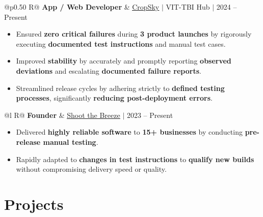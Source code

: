 \documentclass[a4paper,10pt]{article}
\newcommand{\ulink}[2]{\href{#1}{\uline{#2}}}
\newcommand{\subheading}[1]{{\color[HTML]{0A0A0A}\fontsize{12}{14}\selectfont\bfseries #1}}
\newcommand{\meta}[1]{{\color[HTML]{5C5C5C}\fontsize{10.5}{12.5}\selectfont #1}}
\begin{document}
\begin{tabularx}{\linewidth}{@{}p{0.50\linewidth} R@{}}
\subheading{App / Web Developer} & \meta{\ulink{https://sites.google.com/view/cropsky/home}{CropSky} $|$ VIT-TBI Hub $|$ 2024 -- Present}
\end{tabularx}
\begin{itemize}[nosep, leftmargin=1.5em, itemsep=1pt, topsep=2pt]
  \item {\color[HTML]{0A0A0A}\fontsize{11}{14}\selectfont Ensured \textbf{zero critical failures} during \textbf{3 product launches} by rigorously executing \textbf{documented test instructions} and manual test cases.}
  \item {\color[HTML]{0A0A0A}\fontsize{11}{14}\selectfont Improved \textbf{stability} by accurately and promptly reporting \textbf{observed deviations} and escalating \textbf{documented failure reports}.}
  \item {\color[HTML]{0A0A0A}\fontsize{11}{14}\selectfont Streamlined release cycles by adhering strictly to \textbf{defined testing processes}, significantly \textbf{reducing post-deployment errors}.}
\end{itemize}

\vspace{2pt}

\begin{tabularx}{\linewidth}{@{}l R@{}}
\subheading{Founder} & \meta{\ulink{https://shoot-the-breeze.vercel.app}{Shoot the Breeze} $|$ 2023 -- Present}
\end{tabularx}
\begin{itemize}[nosep, leftmargin=1.5em, itemsep=1pt, topsep=2pt]
  \item {\color[HTML]{0A0A0A}\fontsize{11}{14}\selectfont Delivered \textbf{highly reliable software} to \textbf{15+ businesses} by conducting \textbf{pre-release manual testing}.}
  \item {\color[HTML]{0A0A0A}\fontsize{11}{14}\selectfont Rapidly adapted to \textbf{changes in test instructions} to \textbf{qualify new builds} without compromising delivery speed or quality.}
\end{itemize}

\vspace{2pt}

\section{Projects}
\vspace{2pt}
\end{document}
